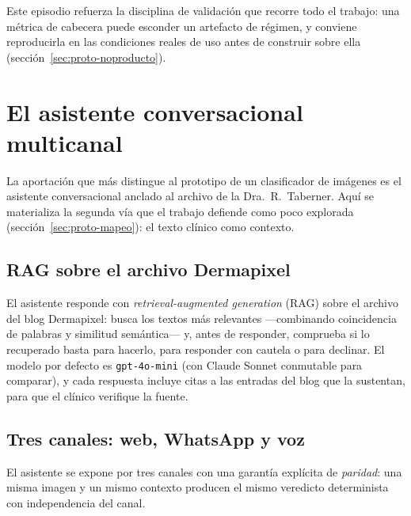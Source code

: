 Este episodio refuerza la disciplina de validación que recorre todo el
trabajo: una métrica de cabecera puede esconder un artefacto de régimen, y
conviene reproducirla en las condiciones reales de uso antes de construir
sobre ella (sección~\ref{sec:proto-noproducto}).

\section{El asistente conversacional multicanal}
\label{sec:proto-asistente}

La aportación que más distingue al prototipo de un clasificador de
imágenes es el asistente conversacional anclado al archivo de la
Dra.~R.~Taberner. Aquí se materializa la segunda vía que el trabajo
defiende como poco explorada (sección~\ref{sec:proto-mapeo}): el texto
clínico como contexto.

\subsection{RAG sobre el archivo Dermapixel}
\label{sec:proto-rag}

El asistente responde con \emph{retrieval-augmented generation} (RAG)
sobre el archivo del blog Dermapixel: busca los textos más relevantes
---combinando coincidencia de palabras y similitud semántica--- y, antes
de responder, comprueba si lo recuperado basta para hacerlo, para
responder con cautela o para declinar. El modelo por defecto es
\texttt{gpt-4o-mini} (con Claude Sonnet conmutable para comparar), y cada
respuesta incluye citas a las entradas del blog que la sustentan, para que
el clínico verifique la fuente.

\subsection{Tres canales: web, WhatsApp y voz}
\label{sec:proto-canales}

El asistente se expone por tres canales con una garantía explícita de
\emph{paridad}: una misma imagen y un mismo contexto producen el mismo
veredicto determinista con independencia del canal.

